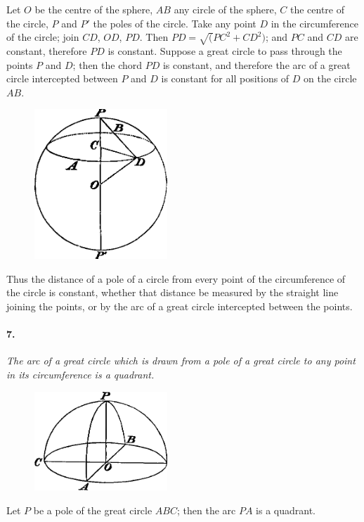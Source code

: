 \documentclass{book}[2004/02/16]
\begin{document}
\begin{mainmatter}
\begin{spacing}{1.3}
Let $O$ be the centre of the sphere, $AB$ any circle of the sphere,
$C$ the centre of the circle, $P$ and $P'$ the poles of the circle. Take
any point $D$ in the circumference of the circle; join $CD$, $OD$, $PD$.
Then $PD=\surd(PC^2+CD^2)$; and $PC$ and $CD$ are constant, therefore
$PD$ is constant. Suppose a great circle to pass through the points
$P$ and $D$; then the chord $PD$ is constant, and therefore the arc of
a great circle intercepted between $P$ and $D$ is constant for all
positions of $D$ on the circle $AB$.
\begin{figure}[htp]
\centering
\includegraphics[width=5cm]{images/013f1c}
\end{figure}

Thus the distance of a pole of a circle from every point of the
circumference of the circle is constant, whether that distance be
measured by the straight line joining the points, or by the arc of
a great circle intercepted between the points.

\paragraph{7.} \textit{The arc of a great circle which is drawn from a pole of a
great circle to any point in its circumference is a quadrant.}
\begin{figure}[htp]
\centering
\includegraphics[width=5cm]{images/013f2c}
\end{figure}

Let $P$ be a pole of the great circle $ABC$; then the arc $PA$ is a
quadrant.


\end{spacing}
\end{mainmatter}
\end{document}

